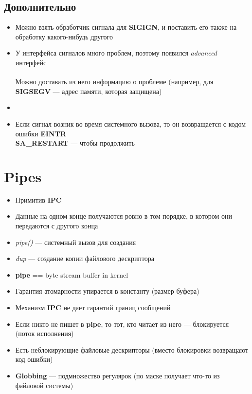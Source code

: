 \documentclass[../../lectures.tex]{subfiles}
\begin{document}
\subsection{Дополнительно}
\begin{itemize}
    \item Можно взять обработчик сигнала для \textbf{SIGIGN}, и поставить его также на обработку какого-нибудь другого

    \item У интерфейса сигналов много проблем, поэтому появился \emph{advanced} интерфейс\\
          \\
          Можно доставать из него информацию о проблеме (например, для \textbf{SIGSEGV} --- адрес памяти, которая защищена)

    \item {}

    \item Если сигнал возник во время системного вызова, то он возвращается с кодом ошибки \textbf{EINTR}\\
          \textbf{SA\_RESTART} --- чтобы продолжить
\end{itemize}

\newpage
\section{Pipes}
\begin{itemize}
    \item Примитив \textbf{IPC}
    \item Данные на одном конце получаются ровно в том порядке, в котором они передаются с другого конца
    \item \emph{pipe()} --- системный вызов для создания\\
    \item \emph{dup} --- создание копии файлового дескриптора\\
    \item \textbf{pipe} == byte stream buffer in kernel
    \item Гарантия атомарности упирается в константу (размер буфера)
    \item Механизм \textbf{IPC} не дает гарантий границ сообщений
    \item Если никто не пишет в \textbf{pipe}, то тот, кто читает из него --- блокируется (поток исполнения)

    \item Есть неблокирующие файловые дескрипторы (вместо блокировки возвращают код ошибки)
    \item \textbf{Globbing} --- подмножество регулярок (по маске получает что-то из файловой системы)
\end{itemize}
\end{document}
